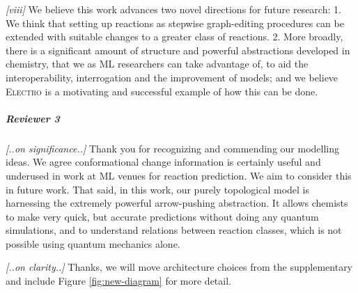 \documentclass{article}
\newcommand{\ourModel}{\textsc{Electro}\xspace}
\begin{document}
\emph{[viii]}
We believe this work advances two novel directions for future research: 
  1. We think that setting up reactions as stepwise graph-editing procedures can be extended with suitable changes to a greater class of reactions.
 2. More broadly, there is a significant amount of structure and powerful abstractions developed in chemistry, that we as ML researchers can take advantage of, to aid the interoperability, interrogation and the improvement of  models;
and we believe \ourModel is a motivating and successful example of how this can be done.





 
 
 



\vspace{-5pt}
\subparagraph*{Reviewer 3}
\emph{[..on significance..]}
Thank you for recognizing and commending our modelling ideas. We agree conformational change information is certainly useful and underused in work at ML venues for reaction prediction. We aim to consider this in future work.
That said, in this work, our purely topological model is harnessing the extremely powerful arrow-pushing abstraction. 
It allows chemists to make very quick, but accurate predictions without doing any quantum simulations, and to understand relations between reaction classes, which is not possible using quantum mechanics alone. 

\emph{[..on clarity..]}
Thanks, we will move architecture choices from the supplementary and include Figure \ref{fig:new-diagram} for more detail.
\end{document}
